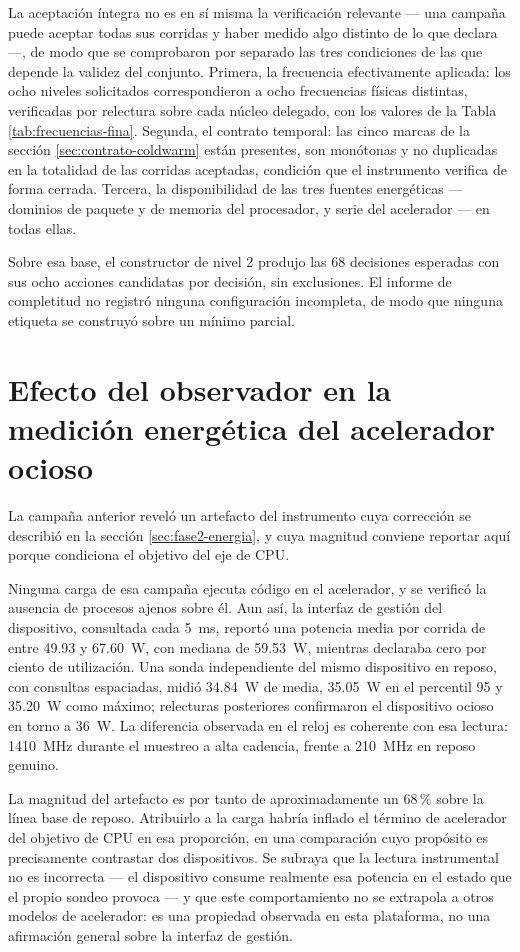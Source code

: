 \documentclass[12pt,oneside,spanish]{book}
\begin{document}
La aceptación íntegra no es en sí misma la verificación relevante --- una campaña puede aceptar todas sus corridas y haber medido algo distinto de lo que declara ---, de modo que se comprobaron por separado las tres condiciones de las que depende la validez del conjunto. Primera, la frecuencia efectivamente aplicada: los ocho niveles solicitados correspondieron a ocho frecuencias físicas distintas, verificadas por relectura sobre cada núcleo delegado, con los valores de la Tabla \ref{tab:frecuencias-fina}. Segunda, el contrato temporal: las cinco marcas de la sección \ref{sec:contrato-coldwarm} están presentes, son monótonas y no duplicadas en la totalidad de las corridas aceptadas, condición que el instrumento verifica de forma cerrada. Tercera, la disponibilidad de las tres fuentes energéticas --- dominios de paquete y de memoria del procesador, y serie del acelerador --- en todas ellas.

Sobre esa base, el constructor de nivel 2 produjo las 68 decisiones esperadas con sus ocho acciones candidatas por decisión, sin exclusiones. El informe de completitud no registró ninguna configuración incompleta, de modo que ninguna etiqueta se construyó sobre un mínimo parcial.

\section{Efecto del observador en la medición energética del acelerador ocioso}
\label{sec:resultados-observador-nvml}

La campaña anterior reveló un artefacto del instrumento cuya corrección se describió en la sección \ref{sec:fase2-energia}, y cuya magnitud conviene reportar aquí porque condiciona el objetivo del eje de CPU.

Ninguna carga de esa campaña ejecuta código en el acelerador, y se verificó la ausencia de procesos ajenos sobre él. Aun así, la interfaz de gestión del dispositivo, consultada cada 5~ms, reportó una potencia media por corrida de entre 49.93 y 67.60~W, con mediana de 59.53~W, mientras declaraba cero por ciento de utilización. Una sonda independiente del mismo dispositivo en reposo, con consultas espaciadas, midió 34.84~W de media, 35.05~W en el percentil 95 y 35.20~W como máximo; relecturas posteriores confirmaron el dispositivo ocioso en torno a 36~W. La diferencia observada en el reloj es coherente con esa lectura: 1410~MHz durante el muestreo a alta cadencia, frente a 210~MHz en reposo genuino.

La magnitud del artefacto es por tanto de aproximadamente un 68\,\% sobre la línea base de reposo. Atribuirlo a la carga habría inflado el término de acelerador del objetivo de CPU en esa proporción, en una comparación cuyo propósito es precisamente contrastar dos dispositivos. Se subraya que la lectura instrumental no es incorrecta --- el dispositivo consume realmente esa potencia en el estado que el propio sondeo provoca --- y que este comportamiento no se extrapola a otros modelos de acelerador: es una propiedad observada en esta plataforma, no una afirmación general sobre la interfaz de gestión.
\end{document}
